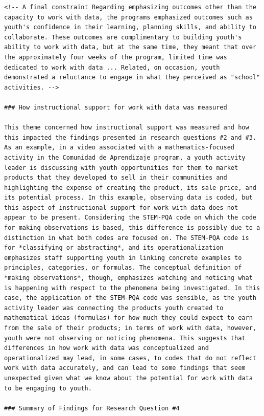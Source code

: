 \documentclass[]{msu-thesis}
\theoremstyle{definition}
\theoremstyle{definition}
\theoremstyle{definition}
\theoremstyle{remark}
\begin{document}
\begin{verbatim}
<!-- A final constraint Regarding emphasizing outcomes other than the capacity to work with data, the programs emphasized outcomes such as youth's confidence in their learning, planning skills, and ability to collaborate. These outcomes are complimentary to building youth's ability to work with data, but at the same time, they meant that over the approximately four weeks of the program, limited time was dedicated to work with data ... Related, on occasion, youth demonstrated a reluctance to engage in what they perceived as "school" activities. -->

### How instructional support for work with data was measured

This theme concerned how instructional support was measured and how this impacted the findings presented in research questions #2 and #3. As an example, in a video associated with a mathematics-focused activity in the Comunidad de Aprendizaje program, a youth activity leader is discussing with youth opportunities for them to market products that they developed to sell in their communities and highlighting the expense of creating the product, its sale price, and its potential process. In this example, observing data is coded, but this aspect of instructional support for work with data does not appear to be present. Considering the STEM-PQA code on which the code for making observations is based, this difference is possibly due to a distinction in what both codes are focused on. The STEM-PQA code is for *classifying or abstracting*, and its operationalization emphasizes staff supporting youth in linking concrete examples to principles, categories, or formulas. The conceptual definition of *making observations*, though, emphasizes watching and noticing what is happening with respect to the phenomena being investigated. In this case, the application of the STEM-PQA code was sensible, as the youth activity leader was connecting the products youth created to mathematical ideas (formulas) for how much they could expect to earn from the sale of their products; in terms of work with data, however, youth were not observing or noticing phenomena. This suggests that differences in how work with data was conceptualized and operationalized may lead, in some cases, to codes that do not reflect work with data accurately, and can lead to some findings that seem unexpected given what we know about the potential for work with data to be engaging to youth.

### Summary of Findings for Research Question #4


\end{verbatim}
\end{document}
